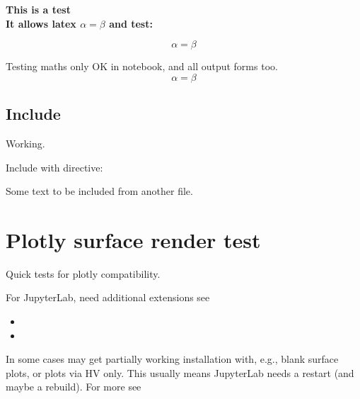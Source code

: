 \documentclass[letterpaper,10pt,english]{jupyterBook}
\begin{document}
\bf{This is a test} \\
It allows latex $\alpha=\beta$ and test:

\begin{equation}
\alpha = \beta
\end{equation}

\sphinxAtStartPar
Testing maths only \sphinxhyphen{} OK in notebook, and all output forms too.
\label{equation:tests/formatting_syntax_tests_081122:19aa4979-fd2b-4e7f-b426-c6d626f1ecbb}\begin{equation}
\alpha = \beta
\end{equation}

\section{Include}
\label{\detokenize{tests/formatting_syntax_tests_081122:include}}
\sphinxAtStartPar
Working.

\sphinxAtStartPar
Include with  directive:

\sphinxAtStartPar
Some text to be included from another file.

\sphinxstepscope


\chapter{Plotly surface render test}
\label{\detokenize{tests/plotly_surface_render_test:plotly-surface-render-test}}\label{\detokenize{tests/plotly_surface_render_test::doc}}
\sphinxAtStartPar
Quick tests for plotly compatibility.

\sphinxAtStartPar
For JupyterLab, need additional extensions \sphinxhyphen{} see 
\begin{itemize}
\item {} 
\sphinxAtStartPar
{}

\item {} 
\sphinxAtStartPar
{}

\end{itemize}

\sphinxAtStartPar
In some cases may get partially working installation with, e.g., blank surface plots, or plots via HV only. This usually means JupyterLab needs a restart (and maybe a rebuild).
For more see 
\end{document}
